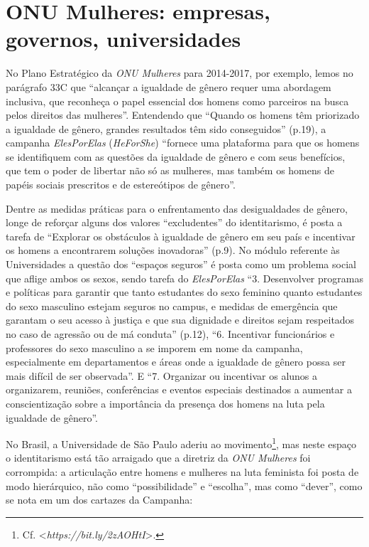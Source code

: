 \chapter{ONU Mulheres: empresas, governos, universidades}

No Plano Estratégico da \emph{ONU Mulheres} para 2014-2017, por exemplo,
lemos no parágrafo 33C que ``alcançar a igualdade de gênero requer uma
abordagem inclusiva, que reconheça o papel essencial dos homens como
parceiros na busca pelos direitos das mulheres''. Entendendo que
``Quando os homens têm priorizado a igualdade de gênero, grandes
resultados têm sido conseguidos'' (p.19), a campanha \emph{ElesPorElas}
(\emph{HeForShe}) ``fornece uma plataforma para que os homens se
identifiquem com as questões da igualdade de gênero e com seus
benefícios, que tem o poder de libertar não só as mulheres, mas também
os homens de papéis sociais prescritos e de estereótipos de gênero''.

Dentre as medidas práticas para o enfrentamento das desigualdades de
gênero, longe de reforçar alguns dos valores ``excludentes'' do
identitarismo, é posta a tarefa de ``Explorar os obstáculos à igualdade
de gênero em seu país e incentivar os homens a encontrarem soluções
inovadoras'' (p.9). No módulo referente às Universidades a questão dos
``espaços seguros'' é posta como um problema social que aflige ambos os
sexos, sendo tarefa do \emph{ElesPorElas} ``3. Desenvolver programas e
políticas para garantir que tanto estudantes do sexo feminino quanto
estudantes do sexo masculino estejam seguros no campus, e medidas de
emergência que garantam o seu acesso à justiça e que sua dignidade e
direitos sejam respeitados no caso de agressão ou de má conduta''
(p.12), ``6. Incentivar funcionários e professores do sexo masculino a
se imporem em nome da campanha, especialmente em departamentos e áreas
onde a igualdade de gênero possa ser mais difícil de ser observada''. E
``7. Organizar ou incentivar os alunos a organizarem, reuniões,
conferências e eventos especiais destinados a aumentar a conscientização
sobre a importância da presença dos homens na luta pela igualdade de
gênero''.

No Brasil, a Universidade de São Paulo aderiu ao movimento\footnote{Cf.
  \textless{}\emph{https://bit.ly/2zAOHtI}\textgreater{}.},
mas neste espaço o identitarismo está tão arraigado que a diretriz da
\emph{ONU Mulheres} foi corrompida: a articulação entre homens e
mulheres na luta feminista foi posta de modo hierárquico, não como
``possibilidade'' e ``escolha'', mas como ``dever'', como se nota em um
dos cartazes da Campanha:

